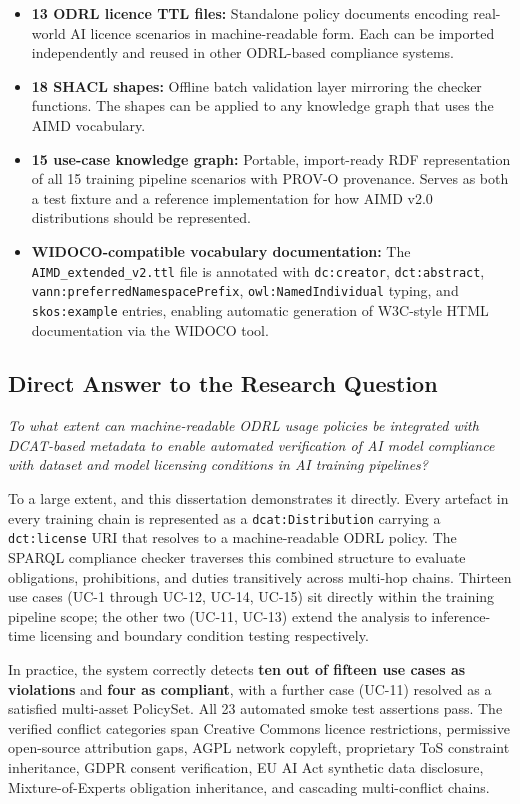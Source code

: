 \documentclass[12pt,a4paper]{article}
\begin{document}
\begin{itemize}[noitemsep]
  \item \textbf{13 ODRL licence TTL files:} Standalone policy documents encoding real-world AI licence scenarios in machine-readable form. Each can be imported independently and reused in other ODRL-based compliance systems.
  \item \textbf{18 SHACL shapes:} Offline batch validation layer mirroring the checker functions. The shapes can be applied to any knowledge graph that uses the AIMD vocabulary.
  \item \textbf{15 use-case knowledge graph:} Portable, import-ready RDF representation of all 15 training pipeline scenarios with PROV-O provenance. Serves as both a test fixture and a reference implementation for how AIMD v2.0 distributions should be represented.
  \item \textbf{WIDOCO-compatible vocabulary documentation:} The \texttt{AIMD\_extended\_v2.ttl} file is annotated with \texttt{dc:creator}, \texttt{dct:abstract}, \texttt{vann:preferredNamespacePrefix}, \texttt{owl:NamedIndividual} typing, and \texttt{skos:example} entries, enabling automatic generation of W3C-style HTML documentation via the WIDOCO tool.
\end{itemize}

\subsection{Direct Answer to the Research Question}

\textit{To what extent can machine-readable ODRL usage policies be integrated with DCAT-based metadata to enable automated verification of AI model compliance with dataset and model licensing conditions in AI training pipelines?}

To a large extent, and this dissertation demonstrates it directly. Every artefact in every training chain is represented as a \texttt{dcat:Distribution} carrying a \texttt{dct:license} URI that resolves to a machine-readable ODRL policy. The SPARQL compliance checker traverses this combined structure to evaluate obligations, prohibitions, and duties transitively across multi-hop chains. Thirteen use cases (UC-1 through UC-12, UC-14, UC-15) sit directly within the training pipeline scope; the other two (UC-11, UC-13) extend the analysis to inference-time licensing and boundary condition testing respectively.

In practice, the system correctly detects \textbf{ten out of fifteen use cases as violations} and \textbf{four as compliant}, with a further case (UC-11) resolved as a satisfied multi-asset PolicySet. All 23 automated smoke test assertions pass. The verified conflict categories span Creative Commons licence restrictions, permissive open-source attribution gaps, AGPL network copyleft, proprietary ToS constraint inheritance, GDPR consent verification, EU AI Act synthetic data disclosure, Mixture-of-Experts obligation inheritance, and cascading multi-conflict chains.
\end{document}
